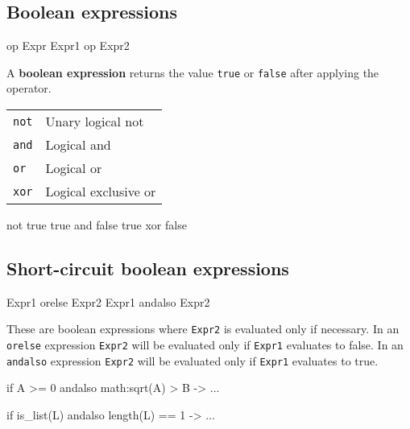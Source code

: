 

\subsection{Boolean expressions}

\begin{erlang}
op Expr
Expr1 op Expr2
\end{erlang}

A \textbf{boolean expression} returns the value \texttt{true} or
\texttt{false} after applying the operator.

\begin{center}
\begin{tabular}{|>{\raggedright}p{79pt}|>{\raggedright}p{241pt}|}
\hline
\multicolumn{2}{|p{321pt}|}{Boolean operators}\tabularnewline
\hline
\texttt{not}  & Unary logical not \tabularnewline
\hline
\texttt{and}  & Logical and \tabularnewline
\hline
\texttt{or}  & Logical or \tabularnewline
\hline
\texttt{xor}  & Logical exclusive or\tabularnewline
\hline
\end{tabular}
\end{center}

\begin{erlang}
not true            %
true and false      %
true xor false      %
\end{erlang}


\subsection{Short-circuit boolean expressions}

\begin{erlang}
Expr1 orelse Expr2
Expr1 andalso Expr2
\end{erlang}

These are boolean expressions where \texttt{Expr2} is evaluated only
if necessary. In an \texttt{orelse} expression \texttt{Expr2} will be
evaluated only if \texttt{Expr1} evaluates to false. In an
\texttt{andalso} expression \texttt{Expr2} will be evaluated only if
\texttt{Expr1} evaluates to true.

\begin{erlang}
if A >= 0 andalso math:sqrt(A) > B -> ...

if is_list(L) andalso length(L) == 1 -> ...
\end{erlang}



